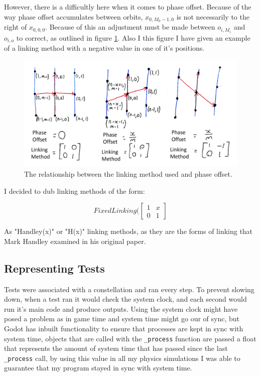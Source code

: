 \documentclass[12pt,a4paper,twoside,openright]{report}
\begin{document}
However, there is a difficultly here when it comes to phase offset. Because of the way phase offset accumulates between orbits, $x_{0,M_0-1,0}$ is not necessarily to the right of $x_{0,0,0}$. Because of this an adjustment must be made between $o_{i,M_i}$ and $o_{i,o}$ to correct, as outlined in figure \ref{Linking Method and Phase Offset}. Also I this figure I have given an example of a linking method with a negative value in one of it's positions.

\begin{figure}
	\caption{The relationship between the linking method used and phase offset.}
	\label{Linking Method and Phase Offset}
	\includegraphics[width=\textwidth]{LinkingMethodAndPhaseOffset}
\end{figure}

I decided to dub linking methods of the form:

\[FixedLinking(\begin{bmatrix} 
1 & x \\
0 & 1\end{bmatrix}\]

As "Handley(x)" or "H(x)" linking methods, as they are the forms of linking that Mark Handley examined in his original paper.


\subsection{Representing Tests}
Tests were associated with a constellation and ran every step. To prevent slowing down, when a test ran it would check the system clock, and each second would run it's main code and produce outputs. Using the system clock might have posed a problem as in game time and system time might go our of sync, but Godot has inbuilt functionality to ensure that processes are kept in sync with system time, objects that are called with the \lstinline{_process} function are passed a float that represents the amount of system time that has passed since the last \lstinline{_process} call, by using this value in all my physics simulations I was able to guarantee that my program stayed in sync with system time.
\end{document}
